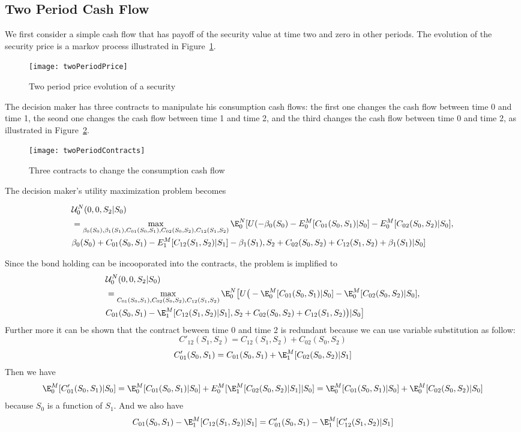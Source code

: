 \subsection{Two Period Cash Flow}
We first consider a simple cash flow that has payoff of the security value at time two and zero in other periods. The evolution of the security price is a markov process illustrated in Figure~\ref{fig:twoPeriodPrice}. 
\begin{figure}
\texttt{[image: twoPeriodPrice]}\newline
\caption{Two period price evolution of a security}%
\label{fig:twoPeriodPrice}%
\end{figure}


The decision maker has three contracts to manipulate his consumption cash flows: the first one changes the cash flow between time 0 and time 1, the seond one changes the cash flow between time 1 and time 2,  and the third changes the cash flow between time 0 and time 2, as illustrated in Figure~\ref{fig:twoPeriodContracts}.   
\begin{figure}
\texttt{[image: twoPeriodContracts]}\newline
\caption{Three contracts to change the consumption cash flow}%
\label{fig:twoPeriodContracts}%
\end{figure}
The decision maker's utility maximization problem becomes

\begin{align*}
&\mathcal{U}^N_0 (0,0, S_2|S_0) \\&= \max_{\beta_0(S_0),\beta_1(S_1), C_{01}(S_0,S_1), C_{02}(S_0,S_2), C_{12}(S_1,S_2)} \E_0^N [U(-\beta_0(S_0) - E_0^M[C_{01}(S_0,S_1)|S_0] - E_0^M[C_{02}(S_0,S_2)|S_0], \\&  \beta_0(S_0) + C_{01}(S_0,S_1) - E_1^M[C_{12}(S_1,S_2)|S_1]-\beta_1(S_1),  S_2+ C_{02}(S_0,S_2)+C_{12}(S_1,S_2) + \beta_1(S_1)|S_0]
\end{align*}

Since the bond holding can be incooporated into the contracts, the problem is implified to
\begin{align*}
&\mathcal{U}^N_0 (0,0, S_2|S_0) \\&= \max_{C_{01}(S_0,S_1), C_{02}(S_0,S_2), C_{12}(S_1,S_2)} \E_0^N \big{[}U\big{(} - \E_0^M[C_{01}(S_0,S_1)|S_0] - \E_0^M[C_{02}(S_0,S_2)|S_0], \\&C_{01}(S_0,S_1) - \E_1^M[C_{12}(S_1,S_2)|S_1], S_2+ C_{02}(S_0,S_2)+C_{12}(S_1,S_2)\big{)} |S_0\big{]}
\end{align*}
Further more it can be shown that the contract beween time 0 and time 2 is redundant because we can use variable substitution as follow:
\[ C'_{12}(S_1,S_2) = C_{12}(S_1,S_2) + C_{02}(S_0,S_2) \]
\[C'_{01}(S_0,S_1) = C_{01}(S_0,S_1) + \E_1^M[C_{02}(S_0,S_2)|S_1] \]
Then we have
\[ \E_0^M[C'_{01}(S_0,S_1)|S_0] =  \E_0^M[C_{01}(S_0,S_1)|S_0] + E_0^M[\E_1^M[C_{02}(S_0,S_2)|S_1]|S_0] = \E_0^M[C_{01}(S_0,S_1)|S_0] +\E_0^M[C_{02}(S_0,S_2)|S_0] \]
because $S_0$ is a function of $S_1$.  And we also have
\[C_{01}(S_0,S_1) - \E_1^M[C_{12}(S_1,S_2)|S_1] = C'_{01}(S_0,S_1) - \E_1^M[C'_{12}(S_1,S_2)|S_1]\]


